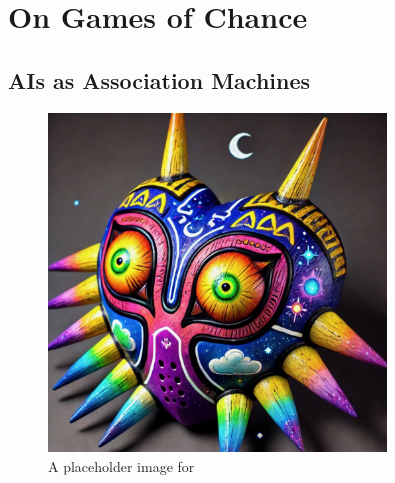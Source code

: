 \documentclass[12pt]{book}
\newcommand{\insertmydocument}[4]%
{ %
  \newpage
  \phantomsection
  \addcontentsline{toc}{#1}{#2}
  
}
\begin{document}

\tableofcontents









\chapter{On Games of Chance}
\section{AIs as Association Machines}


\begin{figure}
    \centering
    \includegraphics[width=0.8\textwidth]{figures/mask.jpeg}
    \caption{A placeholder image for \cite{oxman}}
\end{figure}
\end{document}
